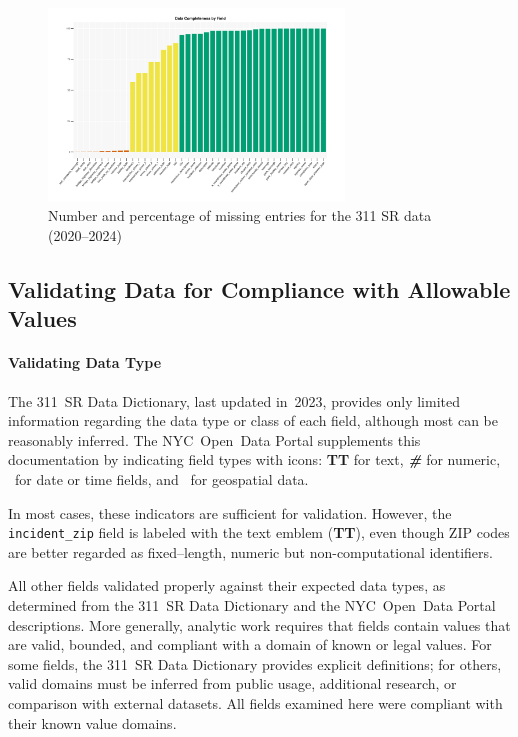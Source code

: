\documentclass[linenumber]{jdsart}
\begin{document}
\begin{figure}[tbp]
	\centering
  	\includegraphics[width=0.7\textwidth, height=0.33\textheight, keepaspectratio]{data_completeness_by_field_bar_chart.pdf}
	\caption{Number and percentage of missing entries for the
          311 SR data (2020--2024)}
	\label{fig:blank_fields}
\end{figure}



\subsection{Validating Data for Compliance with Allowable Values}
\label{subsec:domain}

\paragraph{Validating Data Type}
\label{par:validatingdatatype}
The 311~\textsc{SR} Data Dictionary, last updated in~2023, 
provides only limited information regarding the data type or class of each 
field, although most can be reasonably inferred. 
The NYC~Open~Data Portal supplements this documentation by indicating field 
types with icons: 
\textbf{T}{\scriptsize\textbf{T}} for text, 
\emph{\textbf{\#}} for numeric, 
\faCalendar\ for date or time fields, 
and \faMapMarker\ for geospatial data.

In most cases, these indicators are sufficient for validation. 
However, the \texttt{incident\_zip} field is labeled with the text emblem 
(\textbf{T}{\scriptsize\textbf{T}}), even though ZIP codes are better 
regarded as fixed--length, numeric but non-computational identifiers. 

All other fields validated properly against their expected data types, as 
determined from the 311~\textsc{SR} Data Dictionary and 
the NYC~Open~Data Portal descriptions. 
More generally, analytic work requires that fields contain values that are 
valid, bounded, and compliant with a domain of known or legal values. 
For some fields, the 311~\textsc{SR} Data Dictionary provides explicit 
definitions; for others, valid domains must be inferred from public usage, 
additional research, or comparison with external datasets. All 
fields examined here were compliant with their known value domains.
\end{document}
